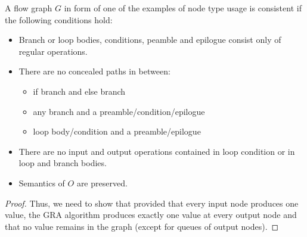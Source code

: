 \begin{observation}
  A flow graph $G$ in form of one of the examples of node type usage is consistent if the following conditions hold:
  \begin{itemize}
    \item Branch or loop bodies, conditions, peamble and epilogue consist only of regular operations. 
    \item There are no concealed paths in between:
      \begin{itemize}
        \item if branch and else branch
        \item any branch and a preamble/condition/epilogue
        \item loop body/condition and a preamble/epilogue
      \end{itemize}
    \item There are no input and output operations contained in loop condition or in loop and branch bodies.
    \item Semantics of $O$ are preserved.
    \end{itemize}
  \begin{proof} 
    Thus, we need to show that provided that every input node produces one value, the GRA algorithm produces exactly one value at every output node and that no value remains in the graph (except for queues of output nodes).


\end{proof}
\end{observation}
